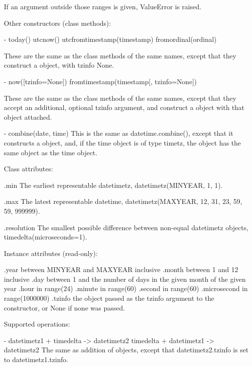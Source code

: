 {    If an argument outside those ranges is given, ValueError is raised.

Other constructors (class methods):

  - today()
    utcnow()
    utcfromtimestamp(timestamp)
    fromordinal(ordinal)

    These are the same as the  class methods of the same names,
    except that they construct a  object, with tzinfo None.

  - now([tzinfo=None])
    fromtimestamp(timestamp[, tzinfo=None])

    These are the same as the  class methods of the same names,
    except that they accept an additional, optional tzinfo argument, and
    construct a  object with that  object attached.

  - combine(date, time)
    This is the same as datetime.combine(), except that it constructs
    a  object, and, if the time object is of type timetz,
    the  object has the same  object as the time object.

Class attributes:

    .min
        The earliest representable datetimetz,
        datetimetz(MINYEAR, 1, 1).

    .max
        The latest representable datetime,
        datetimetz(MAXYEAR, 12, 31, 23, 59, 59, 999999).

    .resolution
        The smallest possible difference between non-equal datetimetz
        objects, timedelta(microseconds=1).

Instance attributes (read-only):

    .year           between MINYEAR and MAXYEAR inclusive
    .month          between 1 and 12 inclusive
    .day            between 1 and the number of days in the given month
                    of the given year
    .hour           in range(24)
    .minute         in range(60)
    .second         in range(60)
    .microsecond    in range(1000000)
    .tzinfo         the object passed as the tzinfo argument to the
                     constructor, or None if none was passed.

Supported operations:

    - datetimetz1 + timedelta -> datetimetz2
      timedelta + datetimetz1 -> datetimetz2
      The same as addition of  objects, except that
      datetimetz2.tzinfo is set to datetimetz1.tzinfo.

}
